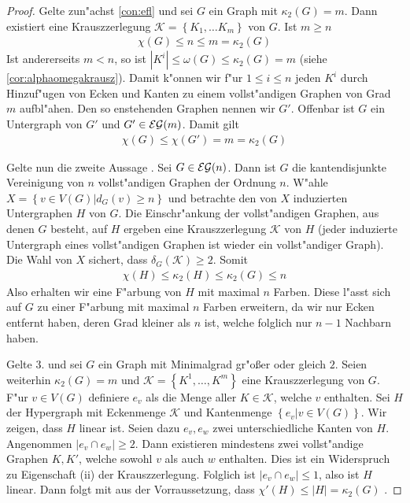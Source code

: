 \begin{proof}
  Gelte zun"achst \ref{con:efl} und sei $G$ ein Graph mit $\kappa_{2}(G) =m$. Dann existiert eine Krauszzerlegung $\mathcal{K} = \left\{ K_1,\dots K_m \right\}$ von $G$. Ist $m \geq n$
  \begin{align*}
    \chi(G) \leq n \leq m = \kappa_2 (G)
  \end{align*}
  Ist andererseits $m< n $, so ist $|K^{i}| \leq \omega (G)  \leq \kappa_2 (G) =  m$ (siehe \ref{cor:alphaomegakrausz}). Damit k"onnen wir f"ur $1\leq i \leq n$ jeden $K^{i}$ durch Hinzuf"ugen von Ecken und Kanten zu einem vollst"andigen Graphen von Grad $m$ aufbl"ahen. Den so enstehenden Graphen nennen wir $G'$. Offenbar ist $G$ ein Untergraph von $G'$ und $G'\in {\cal EG}(m)$. Damit gilt 
  \begin{align*}
    \chi(G) \leq \chi (G') = m = \kappa_{2}(G)
  \end{align*}

  Gelte nun die zweite Aussage . Sei $G\in {\cal EG}(n)$. Dann ist $G$ die kantendisjunkte Vereinigung von $n$ vollst"andigen Graphen der Ordnung $n$. W"ahle $X= \left\{ v\in V(G) | d_G(v) \geq n \right\}$ und betrachte den von $X$ induzierten Untergraphen $H$ von $G$. Die Einschr"ankung der vollst"andigen Graphen, aus denen $G$ besteht, auf $H$ ergeben eine Krauszzerlegung $\mathcal{K}$ von $H$ (jeder induzierte Untergraph eines vollst"andigen Graphen ist wieder ein vollst"andiger
  Graph). Die Wahl von $X$ sichert, dass $\delta_G(\mathcal K) \geq 2$. Somit 
  \begin{align*}
    \chi(H) \leq \kappa_{2}(H) \leq \kappa_{2}(G) \leq n
  \end{align*}
  Also erhalten wir eine F"arbung von $H$ mit maximal $n$ Farben. Diese l"asst sich auf $G$ zu einer F"arbung mit maximal $n$ Farben erweitern, da wir nur Ecken entfernt haben, deren Grad kleiner als $n$ ist, welche folglich nur $n-1$ Nachbarn haben. 

  Gelte 3. und sei $G$ ein Graph mit Minimalgrad gr"o{\ss}er oder gleich $2$. Seien weiterhin $\kappa_{2}(G) = m $ und $\mathcal{K}= \left\{ K^{1},\dots,K^{m} \right\}$ eine Krauszzerlegung von $G$. 
  F"ur $v\in V(G)$ definiere $e_v$ als die Menge aller $K\in \mathcal{K}$, welche $v$ enthalten. 
  Sei $H$ der Hypergraph mit Eckenmenge $\mathcal{K}$ und Kantenmenge $\left\{ e_v| v\in V(G) \right\}$. 
  Wir zeigen, dass $H$ linear ist. 
  Seien dazu $e_{v},e_{w} $ zwei unterschiedliche Kanten von $H$.
  Angenommen $|e_{v}\cap e_{w}| \geq 2$. Dann existieren mindestens zwei vollst"andige Graphen $K,K'$, welche sowohl $v$ als auch $w$ enthalten. Dies ist ein Widerspruch zu Eigenschaft (ii) der Krauszzerlegung. Folglich ist $|e_{v}\cap e_{w}| \leq 1$, also ist $H$ linear. Dann folgt mit aus der Vorraussetzung, dass $\chi'(H) \leq |H| = \kappa_{2}(G)$ .
\end{proof}
